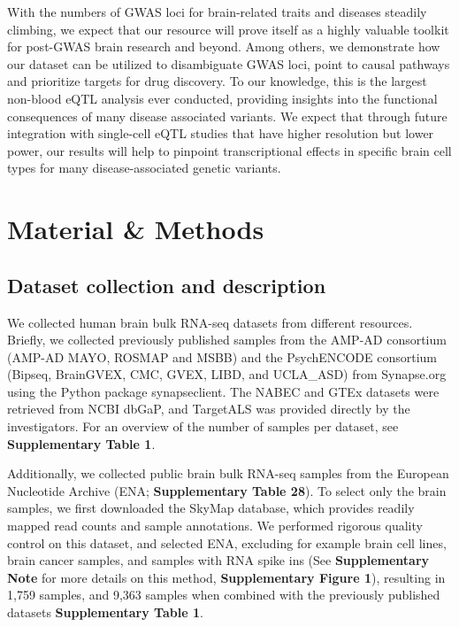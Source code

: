 With the numbers of GWAS loci for brain-related traits and diseases steadily climbing, we expect that our resource will prove itself as a highly valuable toolkit for post-GWAS brain research and beyond. Among others, we demonstrate how our dataset can be utilized to disambiguate GWAS loci, point to causal pathways and prioritize targets for drug discovery. To our knowledge, this is the largest non-blood eQTL analysis ever conducted, providing insights into the functional consequences of many disease associated variants. We expect that through future integration with single-cell eQTL studies that have higher resolution but lower power, our results will help to pinpoint transcriptional effects in specific brain cell types for many disease-associated genetic variants. 

\section{Material \& Methods}
\subsection{Dataset collection and description }
We collected human brain bulk RNA-seq datasets from different resources. Briefly, we collected previously published samples from the AMP-AD consortium (AMP-AD MAYO\cite{hodesAcceleratingMedicinesPartnership2016}, ROSMAP\cite{hodesAcceleratingMedicinesPartnership2016} and MSBB\cite{hodesAcceleratingMedicinesPartnership2016}) and the PsychENCODE consortium (Bipseq\cite{wangComprehensiveFunctionalGenomic2018}, BrainGVEX\cite{wangComprehensiveFunctionalGenomic2018}, CMC\cite{fromerGeneExpressionElucidates2016}, GVEX, LIBD, and UCLA\_ASD\cite{wangComprehensiveFunctionalGenomic2018}) from Synapse.org using the Python package synapseclient\cite{teamSynapseclientClientSynapse}. The NABEC and GTEx datasets were retrieved from NCBI dbGaP, and TargetALS was provided directly by the investigators. For an overview of the number of samples per dataset, see \textbf{Supplementary Table 1}. 

Additionally, we collected public brain bulk RNA-seq samples from the European Nucleotide Archive (ENA; \textbf{Supplementary Table 28}). To select only the brain samples, we first downloaded the SkyMap database\cite{tsuiExtractingAllelicRead2018}, which provides readily mapped read counts and sample annotations. We performed rigorous quality control on this dataset, and selected ENA, excluding for example brain cell lines, brain cancer samples, and samples with RNA spike ins (See \textbf{Supplementary Note} for more details on this method, \textbf{Supplementary Figure 1}), resulting in 1,759 samples, and 9,363 samples when combined with the previously published datasets \textbf{Supplementary Table 1}. 


